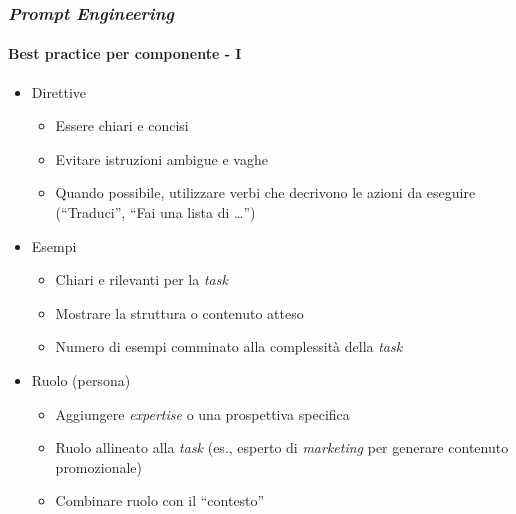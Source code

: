 \begin{frame}[t] \frametitle{\emph{Prompt Engineering}}
\framesubtitle{Best practice per componente - I}
\vspace*{-15pt}
{\small
{}
    \begin{minipage}[t]{\textwidth}
        \begin{itemize}[leftmargin=10pt,align=right]
            \item[\alert{\faArrowCircleRight}] Direttive
            \begin{itemize}[leftmargin=10pt,align=right]
                \item[\alert{\faExclamationTriangle}] Essere chiari e concisi
                \item[\alert{\faExclamationTriangle}] Evitare istruzioni ambigue e vaghe
                \item[\alert{\faExclamationTriangle}] Quando possibile, utilizzare verbi che decrivono le azioni da eseguire (``Traduci'', ``Fai una lista di \ldots'')
            \end{itemize}
            \item[\alert{\faArrowCircleRight}] Esempi
            \begin{itemize}[leftmargin=10pt,align=right]
                \item[\alert{\faExclamationTriangle}] Chiari e rilevanti per la \textit{task}
                \item[\alert{\faExclamationTriangle}] Mostrare la struttura o contenuto atteso
                \item[\alert{\faExclamationTriangle}] Numero di esempi comminato alla complessità della \textit{task}
            \end{itemize}
            \item[\alert{\faArrowCircleRight}] Ruolo (persona)
            \begin{itemize}[leftmargin=10pt,align=right]
                \item[\alert{\faExclamationTriangle}] Aggiungere \textit{expertise} o una prospettiva specifica
                \item[\alert{\faExclamationTriangle}] Ruolo allineato alla \textit{task} (es., esperto di \textit{marketing} per generare contenuto promozionale)
                \item[\alert{\faExclamationTriangle}] Combinare ruolo con il ``contesto''
            \end{itemize}
        \end{itemize}        
    \end{minipage}
}
\end{frame}
